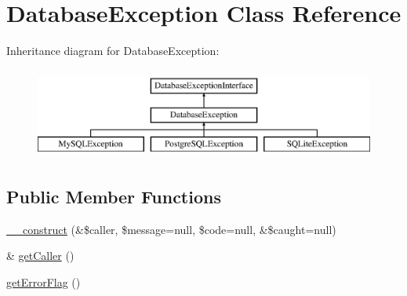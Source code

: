 \hypertarget{class_database_exception}{}\section{Database\+Exception Class Reference}
\label{class_database_exception}
Inheritance diagram for Database\+Exception\+:\begin{figure}[H]
\begin{center}
\leavevmode
\includegraphics[height=3.000000cm]{class_database_exception}
\end{center}
\end{figure}
\subsection*{Public Member Functions}
\begin{DoxyCompactItemize}
\item 
\hyperlink{class_database_exception_ad1f01ac86a6ae06c72165c3a7cb0424a}{\+\_\+\+\_\+construct} (\&\$caller, \$message=null, \$code=null, \&\$caught=null)
\item 
\& \hyperlink{class_database_exception_aedb1e2149e60e99bd62a64f5533c7903}{get\+Caller} ()
\item 
\hyperlink{class_database_exception_aaf4fb3a4978596f9e37fdbdd1e786082}{get\+Error\+Flag} ()
\end{DoxyCompactItemize}
